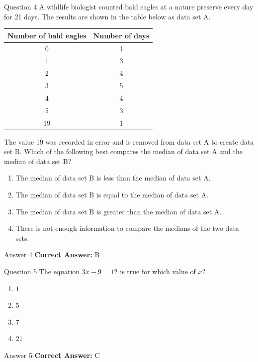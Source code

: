 \documentclass{beamer}
\begin{document}
\begin{frame}{Question 4}
\small
A wildlife biologist counted bald eagles at a nature preserve every day for 21 days. The results are shown in the table below as data set A.

\begin{center}
\begin{tabular}{|c|c|}
\hline
\textbf{Number of bald eagles} & \textbf{Number of days}\\
\hline
0 & 1\\
1 & 3\\
2 & 4\\
3 & 5\\
4 & 4\\
5 & 3\\
19 & 1\\
\hline
\end{tabular}
\end{center}

The value 19 was recorded in error and is removed from data set A to create data set B. Which of the following best compares the median of data set A and the median of data set B?
\vspace{0.35cm}
\begin{enumerate}
    \item[A.] The median of data set B is less than the median of data set A.
    \item[B.] The median of data set B is equal to the median of data set A.
    \item[C.] The median of data set B is greater than the median of data set A.
    \item[D.] There is not enough information to compare the medians of the two data sets.
\end{enumerate}
\end{frame}
\begin{frame}{Answer 4}
\small
\textbf{Correct Answer:} B
\end{frame}

\begin{frame}{Question 5}
\small
The equation \(3x - 9 = 12\) is true for which value of \(x\)?
\vspace{0.35cm}
\begin{enumerate}
    \item[A.] $1$
    \item[B.] $5$
    \item[C.] $7$
    \item[D.] $21$
\end{enumerate}
\end{frame}
\begin{frame}{Answer 5}
\small
\textbf{Correct Answer:} C
\end{frame}
\end{document}
